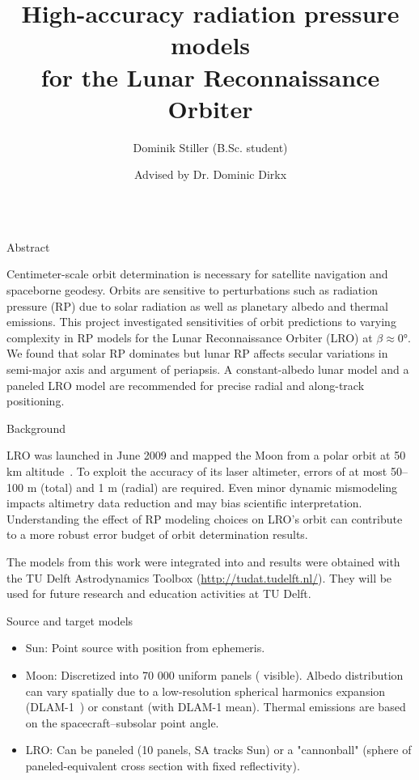 \documentclass[final,20pt]{beamer}
\title{High-accuracy radiation pressure models \\ for the Lunar Reconnaissance Orbiter}
\author{Dominik Stiller (B.Sc. student) \and Advised by Dr. Dominic Dirkx}
\begin{document}
\begin{frame}[t]
\begin{columns}[t]
\separatorcolumn

\begin{column}{\colwidth}

  \begin{exampleblock}{Abstract}

    Centimeter-scale orbit determination is necessary for satellite navigation and spaceborne geodesy. Orbits are sensitive to perturbations such as radiation pressure (RP) due to solar radiation as well as planetary albedo and thermal emissions. This project investigated sensitivities of orbit predictions to varying complexity in RP models for the Lunar Reconnaissance Orbiter (LRO) at $\beta \approx \ang{0}$. We found that solar RP dominates but lunar RP affects secular variations in semi-major axis and argument of periapsis. A constant-albedo lunar model and a paneled LRO model are recommended for precise radial and along-track positioning.

  \end{exampleblock}


  \begin{block}{Background}

    LRO was launched in June 2009 and mapped the Moon from a polar orbit at 50 km altitude~\cite{Tooley2010}. To exploit the accuracy of its laser altimeter, errors of at most 50--100 m (total) and 1 m (radial) are required. Even minor dynamic mismodeling impacts altimetry data reduction and may bias scientific interpretation. Understanding the effect of RP modeling choices on LRO's orbit can contribute to a more robust error budget of orbit determination results.

    The models from this work were integrated into and results were obtained with the TU Delft Astrodynamics Toolbox (\url{http://tudat.tudelft.nl/}). They will be used for future research and education activities at TU Delft.

  \end{block}

  \begin{block}{Source and target models}

    \begin{itemize}
      \item Sun: Point source with position from ephemeris.
      \item Moon: Discretized into 70 000 uniform panels ( visible). Albedo distribution can vary spatially due to a low-resolution spherical harmonics expansion (DLAM-1~\cite{Floberghagen1999}) or constant (with DLAM-1 mean). Thermal emissions are based on the spacecraft--subsolar point angle.
      \item LRO: Can be paneled (10 panels, SA tracks Sun) or a "cannonball" (sphere of paneled-equivalent cross section with fixed reflectivity). %
    \end{itemize}


\end{block}
\end{column}
\end{columns}
\end{frame}
\end{document}
